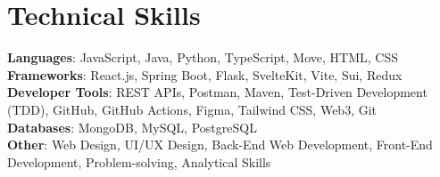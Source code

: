 \documentclass[letterpaper,11pt]{article}
\begin{document}
\section{Technical Skills}
 \begin{itemize}[leftmargin=0.15in, label={}]
    \small{\item{
     \textbf{Languages}: JavaScript, Java, Python, TypeScript, Move, HTML, CSS \\
     \textbf{Frameworks}: React.js, Spring Boot, Flask, SvelteKit, Vite, Sui, Redux \\
     \textbf{Developer Tools}: REST APIs, Postman, Maven, Test-Driven Development (TDD), GitHub, GitHub Actions, Figma, Tailwind CSS, Web3, Git \\
     \textbf{Databases}: MongoDB, MySQL, PostgreSQL \\
     \textbf{Other}: Web Design, UI/UX Design, Back-End Web Development, Front-End Development, Problem-solving, Analytical Skills
    }}
 \end{itemize}

\end{document}
